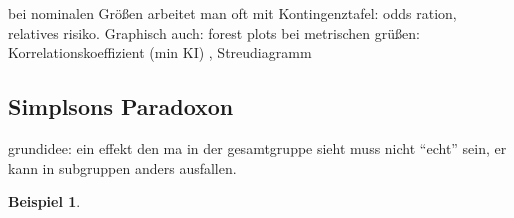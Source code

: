 \documentclass[a4paper]{article}
\theoremstyle{definition}
\newtheorem{beispiel}{Beispiel}%
\theoremstyle{remark}
\begin{document}
bei nominalen Größen arbeitet man oft mit Kontingenztafel: odds ration, relatives risiko. Graphisch auch: forest plots
bei metrischen grüßen: Korrelationskoeffizient (min KI) , Streudiagramm
\subsection{Simplsons Paradoxon}
\label{sub:simplsons_paradoxon}

grundidee: ein effekt den ma in der gesamtgruppe sieht muss nicht ``echt'' sein, er kann in subgruppen anders ausfallen.
\begin{beispiel}
\end{beispiel}
\end{document}
